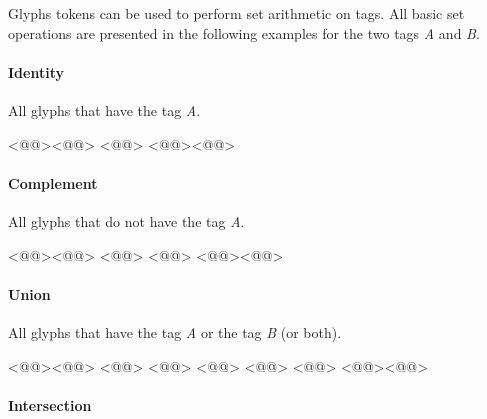 \noindent Glyphs tokens can be used to perform set arithmetic on tags.
All basic set operations are presented in the following examples for the two tags \emph{A} and \emph{B}.

\paragraph{Identity}%
\label{par:identity}


All glyphs that have the tag \emph{A}.

\begin{RichListing}
<@\Token{\$[}@><@@> <@@> <@@><@\Token{]}@>
\end{RichListing}

\vspace{-1em}\paragraph{Complement}%
\label{par:complement}


All glyphs that do not have the tag \emph{A}.

\begin{RichListing}
<@\Token{\$[}@><@@> <@@> <@@> <@@><@\Token{]}@>
\end{RichListing}

\vspace{-1em}\paragraph{Union}%
\label{par:union}


All glyphs that have the tag \emph{A} or the tag \emph{B} (or both).

\begin{RichListing}
<@\Token{\$[}@><@@> <@@> <@@> <@@> <@@> <@@> <@@><@\Token{]}@>
\end{RichListing}

\vspace{-1em}\paragraph{Intersection}%
\label{par:intersection}


